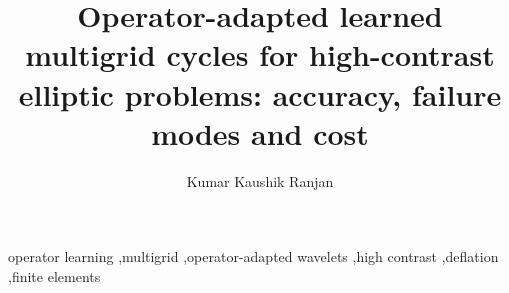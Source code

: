 \documentclass[preprint,12pt]{elsarticle}
\begin{document}
\begin{frontmatter}
\title{Operator-adapted learned multigrid cycles for high-contrast elliptic problems: accuracy, failure modes and cost}
\author[aff1]{Kumar Kaushik Ranjan}
\begin{abstract}

\end{abstract}
\begin{keyword} operator learning \sep multigrid \sep operator-adapted wavelets \sep high contrast \sep deflation \sep finite elements \end{keyword}
\end{frontmatter}



\clearpage   %


\end{document}
